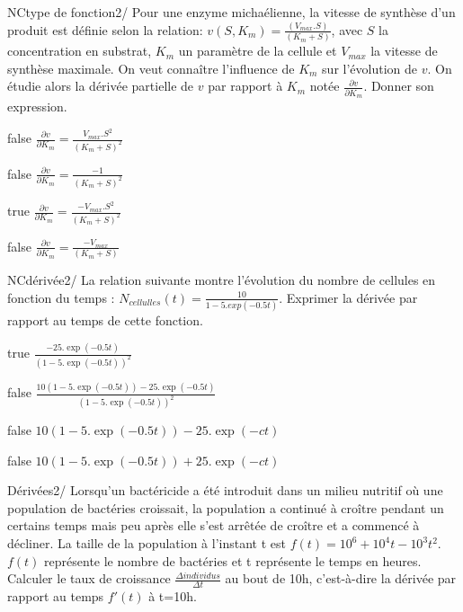             \begin{question}{NC}{type de fonction}{2}{/} 
				Pour une enzyme michaélienne, la vitesse de synthèse d’un produit est définie selon  la relation: $v(S,K_m) = \frac{(V_{max} . S)}{(K_m+S)}$, avec $S$ la concentration en substrat, $K_m$ un paramètre de la cellule et $V_{max}$ la vitesse de synthèse maximale. On veut connaître l'influence de $K_m$ sur l'évolution de $v$. On étudie alors la dérivée partielle de $v$ par rapport à $K_m$ notée $\frac{\partial v}{\partial K_m}$. Donner son expression. 
            \end{question}
            \begin{reponses}
            	\item[false]  $\frac{\partial v}{\partial K_m} = \frac{V_{max}.S^2}{(K_m+S)^2}$
            	\item[false]   $\frac{\partial v}{\partial K_m} = \frac{-1}{(K_m+S)^2}$
                \item[true]  $\frac{\partial v}{\partial K_m} = \frac{-V_{max}.S^2}{(K_m+S)^2}$
                \item[false]  $\frac{\partial v}{\partial K_m} = \frac{-V_{max}}{(K_m+S)}$
            \end{reponses}
				\begin{question}{NC}{dérivée}{2}{/} 
				La relation suivante montre l'évolution du nombre de cellules en fonction du temps : $N_{cellulles}(t)=\frac{10}{1-5.exp(-0.5t)}$. Exprimer la dérivée par rapport au temps de cette fonction.
            \end{question}
            \begin{reponses}
            	\item[true]   $\frac{-25.\exp(-0.5t)}{(1-5.\exp(-0.5t))^{2}}$ 
            	\item[false]  $\frac{10(1-5.\exp(-0.5t))-25.\exp(-0.5t)}{(1-5.\exp(-0.5t))^{2}}$
                \item[false]  ${10(1-5.\exp(-0.5t))-25.\exp(-ct)}$ 
                \item[false]   ${10(1-5.\exp(-0.5t))+25.\exp(-ct)}$
            \end{reponses}
			\begin{question}{22}{Dérivées}{2}{/}
			  Lorsqu'un bactéricide a été introduit dans un milieu nutritif où une population de bactéries croissait, la population a continué à croître pendant un certains temps mais peu après elle s'est arrêtée de croître et a commencé à décliner. La taille de la population à l'instant t est $f(t) = 10^6 + 10^4 t - 10^3 t^2$. $f(t)$ représente le nombre de bactéries et t représente le temps en heures. Calculer le taux de croissance $\frac{\Delta individus}{\Delta t}$ au bout de 10h, c'est-à-dire la dérivée par rapport au temps $f'(t)$ à t=10h.
            \end{question}
